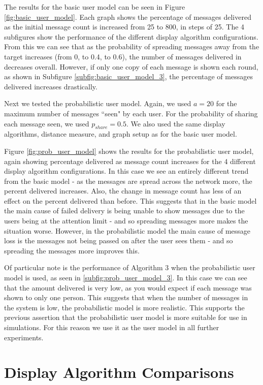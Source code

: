 \documentclass[bsc,frontabs,twoside,singlespacing,parskip,deptreport]{infthesis}     %
\begin{document}
The results for the basic user model can be seen in Figure \ref{fig:basic_user_model}. Each graph shows the percentage of messages delivered as the initial message count is increased from 25 to 800, in steps of 25. The 4 subfigures show the performance of the different display algorithm configurations. From this we can see that as the probability of spreading messages away from the target increases (from 0, to 0.4, to 0.6), the number of messages delivered in decreases overall. However, if only one copy of each message is shown each round, as shown in Subfigure \ref{subfig:basic_user_model_3}, the percentage of messages delivered increases drastically.

Next we tested the probabilistic user model. Again, we used $a=20$ for the maximum number of messages ``seen" by each user. For the probability of sharing each message seen, we used $p_{share}=0.5$. We also used the same display algorithms, distance measure, and graph setup as for the basic user model.

Figure \ref{fig:prob_user_model} shows the results for the probabilistic user model, again showing percentage delivered as message count increases for the 4 different display algorithm configurations. In this case we see an entirely different trend from the basic model - as the messages are spread across the network more, the percent delivered increases. Also, the change in message count has less of an effect on the percent delivered than before. This suggests that in the basic model the main cause of failed delivery is being unable to show messages due to the users being at the attention limit - and so spreading messages more makes the situation worse. However, in the probabilistic model the main cause of message loss is the messages not being passed on after the user sees them - and so spreading the messages more improves this.

Of particular note is the performance of Algorithm 3 when the probabilistic user model is used, as seen in \ref{subfig:prob_user_model_3}. In this case we can see that the amount delivered is very low, as you would expect if each message was shown to only one person. This suggests that when the number of messages in the system is low, the probabilistic model is more realistic. This supports the previous assertion that the probabilistic user model is more suitable for use in simulations. For this reason we use it as the user model in all further experiments.

\section{Display Algorithm Comparisons} \label{sec:display_alg_comparisons}
\end{document}
